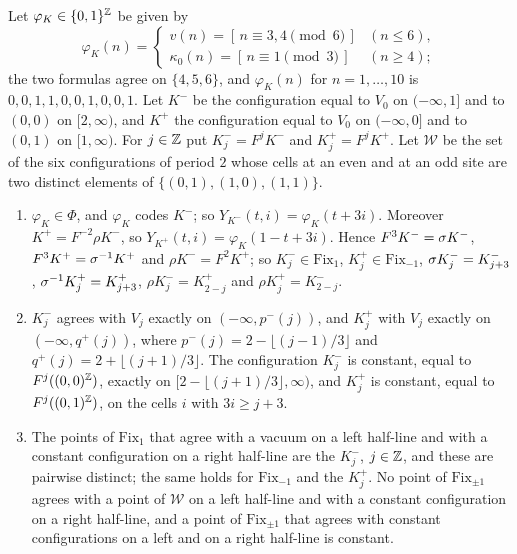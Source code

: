 Let $\varphi_K\in\{0,1\}^{\mathbb{Z}}$ be given by
\[
\varphi_K(n)=\begin{cases}v(n)=[\,n\equiv3,4\pmod 6\,]&(n\le6),\\ \kappa_0(n)=[\,n\equiv1\pmod 3\,]&(n\ge4);\end{cases}
\]
the two formulas agree on $\{4,5,6\}$, and $\varphi_K(n)$ for $n=1,\dots,10$ is $0,0,1,1,0,0,1,0,0,1$. Let $K^-$ be the configuration equal to $V_0$ on $(-\infty,1]$ and to $(0,0)$ on $[2,\infty)$, and $K^+$ the configuration equal to $V_0$ on $(-\infty,0]$ and to $(0,1)$ on $[1,\infty)$. For $j\in\mathbb{Z}$ put $K^-_j=F^jK^-$ and $K^+_j=F^jK^+$. Let $\mathcal W$ be the set of the six configurations of period $2$ whose cells at an even and at an odd site are two distinct elements of $\{(0,1),(1,0),(1,1)\}$.

\begin{lemma}[kinks]\label{c79:lem:kinks}
\begin{enumerate}
\item[(a)] $\varphi_K\in\Phi$, and $\varphi_K$ codes $K^-$; so $Y_{K^-}(t,i)=\varphi_K(t+3i)$. Moreover $K^+=F^{-2}\rho K^-$, so $Y_{K^+}(t,i)=\varphi_K(1-t+3i)$. Hence $F^3K^-=\sigma K^-$, $F^3K^+=\sigma^{-1}K^+$ and $\rho K^-=F^2K^+$; so $K^-_j\in\mathrm{Fix}_1$, $K^+_j\in\mathrm{Fix}_{-1}$, $\sigma K^-_j=K^-_{j+3}$, $\sigma^{-1}K^+_j=K^+_{j+3}$, $\rho K^-_j=K^+_{2-j}$ and $\rho K^+_j=K^-_{2-j}$.
\item[(b)] $K^-_j$ agrees with $V_j$ exactly on $(-\infty,p^-(j))$, and $K^+_j$ with $V_j$ exactly on $(-\infty,q^+(j))$, where $p^-(j)=2-\lfloor(j-1)/3\rfloor$ and $q^+(j)=2+\lfloor(j+1)/3\rfloor$. The configuration $K^-_j$ is constant, equal to $F^j((0,0)^{\mathbb{Z}})$, exactly on $[2-\lfloor(j+1)/3\rfloor,\infty)$, and $K^+_j$ is constant, equal to $F^j((0,1)^{\mathbb{Z}})$, on the cells $i$ with $3i\ge j+3$.
\item[(c)] The points of $\mathrm{Fix}_1$ that agree with a vacuum on a left half-line and with a constant configuration on a right half-line are the $K^-_j$, $j\in\mathbb{Z}$, and these are pairwise distinct; the same holds for $\mathrm{Fix}_{-1}$ and the $K^+_j$. No point of $\mathrm{Fix}_{\pm1}$ agrees with a point of $\mathcal W$ on a left half-line and with a constant configuration on a right half-line, and a point of $\mathrm{Fix}_{\pm1}$ that agrees with constant configurations on a left and on a right half-line is constant.
\end{enumerate}
\end{lemma}

